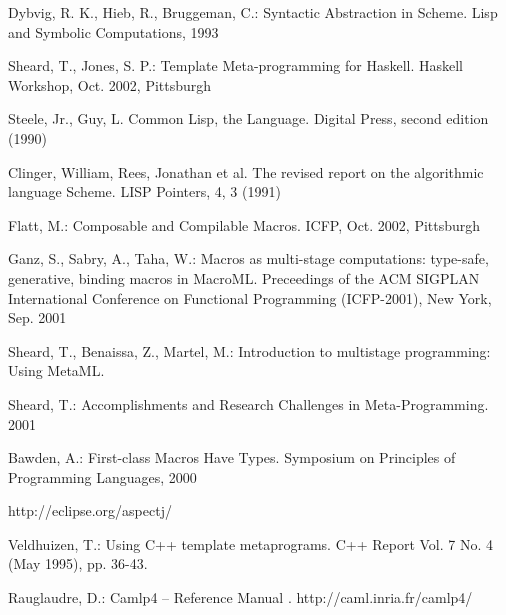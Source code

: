 \documentclass{llncs}
\begin{document}
%
%
\begin{thebibliography}{}
%
Dybvig, R. K., Hieb, R., Bruggeman, C.:
Syntactic Abstraction in Scheme.
Lisp and Symbolic Computations, 1993

Sheard, T., Jones, S. P.:
Template Meta-programming for Haskell.
Haskell Workshop, Oct. 2002, Pittsburgh

Steele, Jr., Guy, L.
Common Lisp, the Language.
Digital Press, second edition (1990)

Clinger, William, Rees, Jonathan et al.
The revised report on the algorithmic language Scheme.
LISP Pointers, 4, 3 (1991)

Flatt, M.:
Composable and Compilable Macros.
ICFP, Oct. 2002, Pittsburgh

Ganz, S., Sabry, A., Taha, W.:
Macros as multi-stage computations: type-safe, generative, binding macros in MacroML.
Preceedings of the ACM SIGPLAN International Conference on Functional Programming (ICFP-2001),
New York, Sep. 2001

Sheard, T., Benaissa, Z., Martel, M.:
Introduction to multistage programming: Using MetaML.

Sheard, T.:
Accomplishments and Research Challenges in Meta-Programming.
2001

Bawden, A.:
First-class Macros Have Types.
Symposium on Principles of Programming Languages, 2000

http://eclipse.org/aspectj/

Veldhuizen, T.:
Using C++ template metaprograms.
C++ Report Vol. 7 No. 4 (May 1995), pp. 36-43.

Rauglaudre, D.: 
Camlp4 -- Reference Manual .
http://caml.inria.fr/camlp4/

\end{thebibliography}
\end{document}
